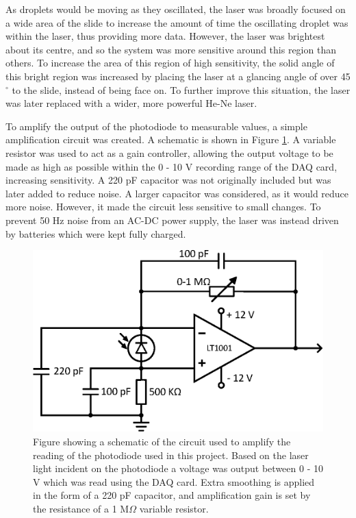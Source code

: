 \documentclass{physics_article_B}
\begin{document}
        As droplets would be moving as they oscillated, the laser was broadly focused on a wide area of the slide to increase the amount of time the oscillating droplet was within the laser, thus providing more data. However, the laser was brightest about its centre, and so the system was more sensitive around this region than others. To increase the area of this region of high sensitivity, the solid angle of this bright region was increased by placing the laser at a glancing angle of over 45$^{\circ}$ to the slide, instead of being face on. To further improve this situation, the laser was later replaced with a wider, more powerful He-Ne laser.
        
        \newpage To amplify the output of the photodiode to measurable values, a simple amplification circuit was created\cite{artofelectronics}. A schematic is shown in Figure \ref{fig:PDCircuit}. A variable resistor was used to act as a gain controller, allowing the output voltage to be made as high as possible within the 0 - 10 V recording range of the DAQ card, increasing sensitivity. A 220 pF capacitor was not originally included but was later added to reduce noise\cite{artofelectronics}. A larger capacitor was considered, as it would reduce more noise. However, it made the circuit less sensitive to small changes. To prevent 50 Hz noise from an AC-DC power supply, the laser was instead driven by batteries which were kept fully charged.
    
            \begin{figure}[H]
                \centering
                \hspace{0.1cm}\includegraphics[scale=0.8]{Figures/PDCircuit.eps}
                \caption{Figure showing a schematic of the circuit used to amplify the reading of the photodiode used in this project. Based on the laser light incident on the photodiode a voltage was output between 0 - 10 V which was read using the DAQ card. Extra smoothing is applied in the form of a 220 pF capacitor, and amplification gain is set by the resistance of a 1 M$\Omega$ variable resistor.}
                \label{fig:PDCircuit}
            \end{figure}
    
\end{document}
